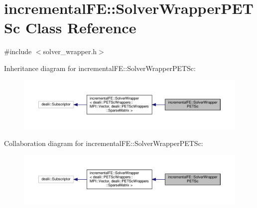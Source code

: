 \hypertarget{classincremental_f_e_1_1_solver_wrapper_p_e_t_sc}{}\section{incremental\+FE\+:\+:Solver\+Wrapper\+P\+E\+T\+Sc Class Reference}
\label{classincremental_f_e_1_1_solver_wrapper_p_e_t_sc}


{\ttfamily \#include $<$solver\+\_\+wrapper.\+h$>$}



Inheritance diagram for incremental\+FE\+:\+:Solver\+Wrapper\+P\+E\+T\+Sc\+:\nopagebreak
\begin{figure}[H]
\begin{center}
\leavevmode
\includegraphics[width=350pt]{classincremental_f_e_1_1_solver_wrapper_p_e_t_sc__inherit__graph}
\end{center}
\end{figure}


Collaboration diagram for incremental\+FE\+:\+:Solver\+Wrapper\+P\+E\+T\+Sc\+:\nopagebreak
\begin{figure}[H]
\begin{center}
\leavevmode
\includegraphics[width=350pt]{classincremental_f_e_1_1_solver_wrapper_p_e_t_sc__coll__graph}
\end{center}
\end{figure}
